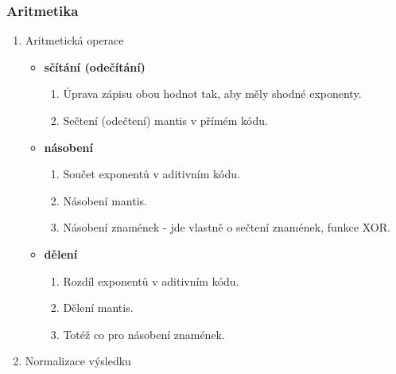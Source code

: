   \begin{frame}
    \frametitle{Aritmetika}

    \begin{enumerate}
      \item Aritmetická operace
      
      \begin{itemize}
        \item \textbf{sčítání (odečítání)}
        
        \begin{enumerate}
          \item Úprava zápisu obou hodnot tak, aby měly shodné exponenty.
          \item Sečtení (odečtení) mantis v přímém kódu.
        \end{enumerate}
        
        \item \textbf{násobení}
        \begin{enumerate}
          \item Součet exponentů v aditivním kódu.
          \item Násobení mantis.
          \item Násobení znamének - jde vlastně o sečtení znamének, funkce XOR.
        \end{enumerate}
        
        \item \textbf{dělení}
        \begin{enumerate}
          \item Rozdíl exponentů v aditivním kódu.
          \item Dělení mantis.
          \item Totéž co pro násobení znamének.
        \end{enumerate}
        
      \end{itemize}
      
      \item Normalizace výsledku
    \end{enumerate}
	\end{frame}